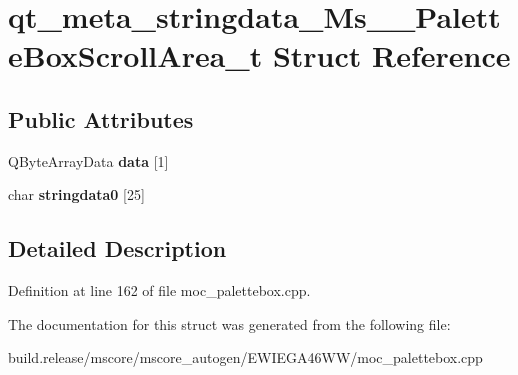 \hypertarget{structqt__meta__stringdata___ms_____palette_box_scroll_area__t}{}\section{qt\+\_\+meta\+\_\+stringdata\+\_\+\+Ms\+\_\+\+\_\+\+Palette\+Box\+Scroll\+Area\+\_\+t Struct Reference}
\label{structqt__meta__stringdata___ms_____palette_box_scroll_area__t}
\subsection*{Public Attributes}
\begin{DoxyCompactItemize}
\item 
\mbox{\label{structqt__meta__stringdata___ms_____palette_box_scroll_area__t_ad73bcfede0395f2b79e0dc1a108c0e8e}} 
Q\+Byte\+Array\+Data {\bfseries data} \mbox{[}1\mbox{]}
\item 
\mbox{\label{structqt__meta__stringdata___ms_____palette_box_scroll_area__t_a197ec11e6072bef69987fed9f9f4588b}} 
char {\bfseries stringdata0} \mbox{[}25\mbox{]}
\end{DoxyCompactItemize}


\subsection{Detailed Description}


Definition at line 162 of file moc\+\_\+palettebox.\+cpp.



The documentation for this struct was generated from the following file\+:\begin{DoxyCompactItemize}
\item 
build.\+release/mscore/mscore\+\_\+autogen/\+E\+W\+I\+E\+G\+A46\+W\+W/moc\+\_\+palettebox.\+cpp\end{DoxyCompactItemize}
